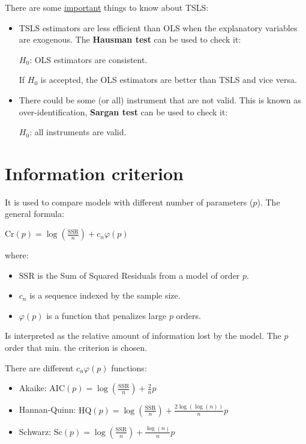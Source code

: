 \documentclass[10pt, a4paper, landscape]{extarticle}
\newcommand{\SSR}{\mathrm{SSR}}
\begin{document}
\begin{multicols}{3}
\begin{itemize}[leftmargin=*]
	There are some \underline{important} things to know about TSLS:

	\begin{itemize}[leftmargin=*]
		\item TSLS estimators are less efficient than OLS when the explanatory variables are exogenous. The \textbf{Hausman test} can be used to check it:
		\begin{center}
			$H_0$: OLS estimators are consistent.
		\end{center}
	
		If $H_0$ is accepted, the OLS estimators are better than TSLS and vice versa.
		\item There could be some (or all) instrument that are not valid. This is known as over-identification, \textbf{Sargan test} can be used to check it:
	
		\begin{center}
			$H_0$: all instruments are valid.
		\end{center}
	\end{itemize}
\end{itemize}

\columnbreak

\section*{Information criterion}

It is used to compare models with different number of parameters ($p$). The general formula:

\begin{center}
	$\mathrm{Cr}(p) = \log(\frac{\SSR}{n}) + c_n \varphi (p)$
\end{center}

where:

\begin{itemize}[leftmargin=*]
	\item $\SSR$ is the Sum of Squared Residuals from a model of order $p$.
	\item $c_n$ is a sequence indexed by the sample size.
	\item $\varphi(p)$ is a function that penalizes large $p$ orders.
\end{itemize}

Is interpreted as the relative amount of information lost by the model. The $p$ order that min. the criterion is chosen.

There are different $c_n \varphi(p)$ functions:

\begin{itemize}[leftmargin=*]
	\item Akaike: $\mathrm{AIC}(p) = \log(\frac{\SSR}{n}) + \frac{2}{n} p$
	\item Hannan-Quinn: $\mathrm{HQ}(p) = \log(\frac{\SSR}{n}) + \frac{2 \log(\log(n))}{n} p$
	\item Schwarz: $\mathrm{Sc}(p) = \log(\frac{\SSR}{n}) + \frac{\log(n)}{n} p$
\end{itemize}


\end{multicols}
\end{document}
